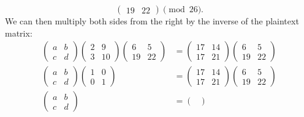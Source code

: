 \documentclass[12pt]{article}
\newenvironment{answer}
    {\begin{adjustwidth}{0pt}{0pt}}
    {\end{adjustwidth}}
\theoremstyle{remark}  %
\begin{document}
\begin{answer}
$$\begin{pmatrix}
                19 & 22
            \end{pmatrix} \pmod{26}
        .$$ We can then multiply both sides from the right by the inverse of the plaintext matrix:
        \begin{align*}
            \begin{pmatrix}
                a & b \\
                c & d
            \end{pmatrix}
            \begin{pmatrix}
                2 & 9 \\
                3 & 10
            \end{pmatrix}
            \begin{pmatrix}
                6 & 5 \\
                19 & 22
            \end{pmatrix} &= 
            \begin{pmatrix}
                17 & 14 \\
                17 & 21
            \end{pmatrix}
            \begin{pmatrix}
                6 & 5 \\
                19 & 22
            \end{pmatrix} \\
            \begin{pmatrix}
                a & b \\
                c & d
            \end{pmatrix}
            \begin{pmatrix}
                1 & 0 \\
                0 & 1
            \end{pmatrix} &=
            \begin{pmatrix}
                17 & 14 \\
                17 & 21
            \end{pmatrix}
            \begin{pmatrix}
                6 & 5 \\
                19 & 22
            \end{pmatrix} \\
            \begin{pmatrix}
                a & b \\
                c & d
            \end{pmatrix} &=
            \begin{pmatrix}

\end{pmatrix}
\end{align*}
\end{answer}
\end{document}
